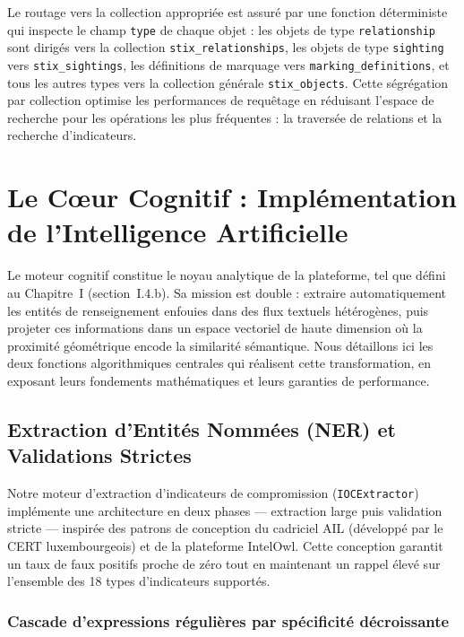 Le routage vers la collection appropriée est assuré par une fonction déterministe qui inspecte le champ \texttt{type} de chaque objet : les objets de type \texttt{relationship} sont dirigés vers la collection \texttt{stix\_relationships}, les objets de type \texttt{sighting} vers \texttt{stix\_sightings}, les définitions de marquage vers \texttt{marking\_definitions}, et tous les autres types vers la collection générale \texttt{stix\_objects}. Cette ségrégation par collection optimise les performances de requêtage en réduisant l'espace de recherche pour les opérations les plus fréquentes : la traversée de relations et la recherche d'indicateurs.



\section{Le C\oe ur Cognitif : Implémentation de l'Intelligence Artificielle}

Le moteur cognitif constitue le noyau analytique de la plateforme, tel que défini au Chapitre~I (section~I.4.b). Sa mission est double : extraire automatiquement les entités de renseignement enfouies dans des flux textuels hétérogènes, puis projeter ces informations dans un espace vectoriel de haute dimension où la proximité géométrique encode la similarité sémantique. Nous détaillons ici les deux fonctions algorithmiques centrales qui réalisent cette transformation, en exposant leurs fondements mathématiques et leurs garanties de performance.

\subsection{Extraction d'Entités Nommées (NER) et Validations Strictes}

Notre moteur d'extraction d'indicateurs de compromission (\texttt{IOCExtractor}) implémente une architecture en deux phases --- extraction large puis validation stricte --- inspirée des patrons de conception du cadriciel AIL (développé par le CERT luxembourgeois) et de la plateforme IntelOwl. Cette conception garantit un taux de faux positifs proche de zéro tout en maintenant un rappel élevé sur l'ensemble des 18 types d'indicateurs supportés.

\subsubsection{Cascade d'expressions régulières par spécificité décroissante}

